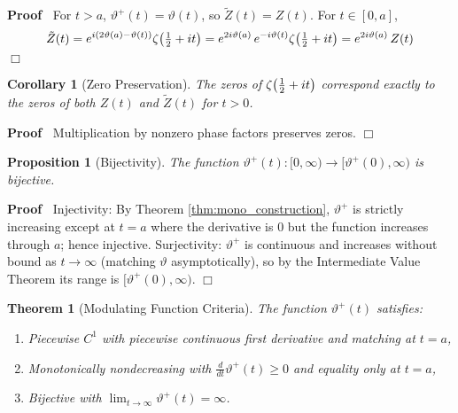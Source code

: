 \documentclass{article}
\newenvironment{proof}{\noindent\textbf{Proof\ }}{\hspace*{\fill}$\Box$\medskip}
\newtheorem{corollary}{Corollary}
\newtheorem{proposition}{Proposition}
\newtheorem{theorem}{Theorem}
\begin{document}
\begin{proof}
  For $t > a$, $\vartheta^+ (t) = \vartheta (t)$, so $\tilde{Z} (t) = Z (t)$.
  For $t \in [0, a]$,
  \[ \tilde{Z} (t) = e^{i (2 \vartheta (a) - \vartheta (t))} \zeta
     \hspace{-0.17em} \left( \tfrac{1}{2} + it \right) = e^{2 i \vartheta (a)}
     \hspace{0.17em} e^{- i \vartheta (t)} \zeta \hspace{-0.17em} \left(
     \tfrac{1}{2} + it \right) = e^{2 i \vartheta (a)}  \hspace{0.17em} Z (t)
  \]
\end{proof}

\begin{corollary}
  [Zero Preservation]\label{cor:zeros} The zeros of $\zeta \hspace{-0.17em}
  \left( \frac{1}{2} + it \right)$ correspond exactly to the zeros of both $Z
  (t)$ and $\tilde{Z} (t)$ for $t > 0$.
\end{corollary}

\begin{proof}
  Multiplication by nonzero phase factors preserves zeros.
\end{proof}

\begin{proposition}
  [Bijectivity]\label{prop:bijective} The function $\vartheta^+ (t) : [0,
  \infty) \to [\vartheta^+ (0), \infty)$ is bijective.
\end{proposition}

\begin{proof}
  Injectivity: By Theorem \ref{thm:mono_construction}, $\vartheta^+$ is
  strictly increasing except at $t = a$ where the derivative is $0$ but the
  function increases through $a$; hence injective. Surjectivity: $\vartheta^+$
  is continuous and increases without bound as $t \to \infty$ (matching
  $\vartheta$ asymptotically), so by the Intermediate Value Theorem its range
  is $[\vartheta^+ (0), \infty)$.
\end{proof}

\begin{theorem}
  [Modulating Function Criteria]\label{thm:modulating} The function
  $\vartheta^+ (t)$ satisfies:
  \begin{enumerate}
    \item Piecewise $C^1$ with piecewise continuous first derivative and
    matching at $t = a$,
    
    \item Monotonically nondecreasing with $\frac{d}{dt} \vartheta^+ (t) \ge
    0$ and equality only at $t = a$,
    
    \item Bijective with $\lim_{t \to \infty} \vartheta^+ (t) = \infty$.
  \end{enumerate}
\end{theorem}
\end{document}
